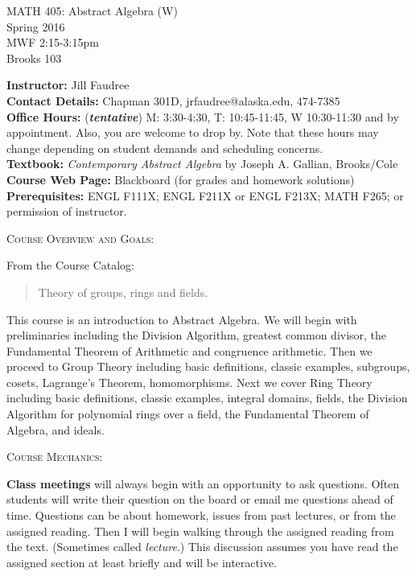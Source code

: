 \documentclass[11pt]{article}
\begin{document}
\begin{center}MATH 405: Abstract Algebra (W)  \\ Spring 2016 \\ MWF 2:15-3:15pm \\ Brooks 103
\end{center}

\hrulefill

\textbf{Instructor:} Jill Faudree\\
\textbf{Contact Details:} Chapman 301D, jrfaudree@alaska.edu, 474-7385\\
\textbf{Office Hours:} (\textbf{\emph{tentative}})  M: 3:30-4:30, T: 10:45-11:45, W 10:30-11:30 and by appointment. Also, you are welcome to drop by. Note that these hours may change depending on student demands and scheduling concerns.\\
\textbf{Textbook:} \emph{Contemporary Abstract Algebra} by Joseph A. Gallian, Brooks/Cole\\
\textbf{Course Web Page:} Blackboard (for grades and homework solutions)\\
\textbf{Prerequisites:} ENGL F111X; ENGL F211X or ENGL F213X; MATH F265; or permission of instructor.  \\
\hrulefill

\textsc{Course Overview and Goals:}

 From the Course Catalog:
\begin{quote}
Theory of groups, rings and fields.  \end{quote}

This course is an introduction to Abstract Algebra. We will begin with preliminaries including  the  Division Algorithm, greatest common divisor, the Fundamental Theorem of Arithmetic and congruence arithmetic. Then we proceed to Group Theory including basic definitions, classic examples, subgroups, cosets, Lagrange's Theorem, homomorphisms. Next we cover Ring Theory including basic definitions, classic examples, integral domains, fields, the Division Algorithm for polynomial rings over a field, the Fundamental Theorem of Algebra, and ideals.

\textsc{Course Mechanics}:

\textbf{Class meetings} will always begin with an opportunity to ask questions. Often students will write their question on the board or email me questions ahead of time. Questions can be about homework, issues from past lectures, or from the assigned reading. Then I will begin walking through the assigned reading from the text. (Sometimes called {\it{lecture}}.) This discussion assumes you have read the assigned section at least briefly and will be interactive.
\end{document}
